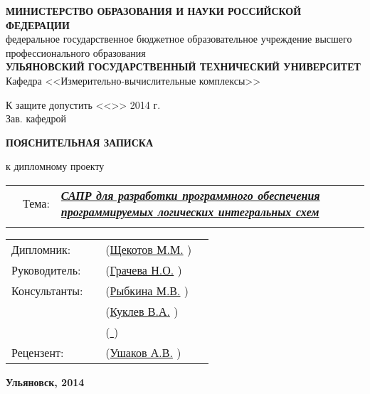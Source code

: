 
\small
\begin{center}

\uppercase{\textbf{министерство образования и науки российской федерации}}\\
федеральное государственное бюджетное образовательное учреждение высшего профессионального образования\\
\uppercase{\textbf{ульяновский государственный технический университет}}\\[0.7cm]

Кафедра <<Измерительно-вычислительные комплексы>>\\[0.7cm]

\begin{flushright}

К защите допустить <<\underline{\hspace{1cm}}>>\underline{\hspace{2.5cm}} 2014 г.\\
Зав. кафедрой \underline{\hspace{3.5cm}}

\end{flushright}

\vspace{1.5cm}

\LARGE

\textbf{ПОЯСНИТЕЛЬНАЯ ЗАПИСКА}

\Large

к дипломному проекту\\[0.9cm]

\normalsize

\begin{flushleft}
\begin{tabular}{p{0.7cm} p{1.5cm} p{13.1cm}}
  & Тема: &
  \textbf{\textit{\uline{САПР для разработки программного обеспечения программируемых логических интегральных схем\hfill}}}
  \\
  & & \uline{\hfill}
\end{tabular}
\end{flushleft}

\vspace{2cm}

\begin{tabular}{l m{6cm} m{5cm} l}
    Дипломник:    & \uline{\hfill} & (\uline{Щекотов М.М.\hfill}   )  & \\[0.5cm]
    Руководитель: & \uline{\hfill} & (\uline{Грачева Н.О.\hfill}   )  & \\[0.5cm]
    Консультанты: & \uline{\hfill} & (\uline{Рыбкина М.В.\hfill}   )  & \\[0.5cm]
                  & \uline{\hfill} & (\uline{Куклев  В.А.\hfill}   )  & \\[0.5cm]
                  & \uline{\hfill} & (\uline{            \hfill}   )  & \\[0.5cm]
    Рецензент:    & \uline{\hfill} & (\uline{Ушаков  А.В.\hfill}   )  & \\
\end{tabular}

\vfill

\textbf{Ульяновск, 2014}

\end{center}

\restoregeometry